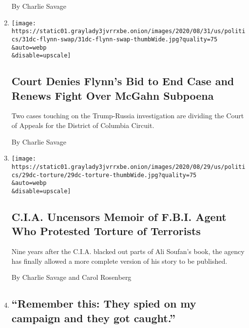\begin{enumerate}
  By Charlie Savage
\item
  \href{/2020/08/31/us/politics/michael-flynn-appeals-court.html}{}

  \texttt{[image: https://static01.graylady3jvrrxbe.onion/images/2020/08/31/us/politics/31dc-flynn-swap/31dc-flynn-swap-thumbWide.jpg?quality=75\\\&auto=webp\\\&disable=upscale]}

  \hypertarget{court-denies-flynns-bid-to-end-case-and-renews-fight-over-mcgahn-subpoena}{%
  \subsection{Court Denies Flynn's Bid to End Case and Renews Fight Over
  McGahn
  Subpoena}\label{court-denies-flynns-bid-to-end-case-and-renews-fight-over-mcgahn-subpoena}}

  Two cases touching on the Trump-Russia investigation are dividing the
  Court of Appeals for the District of Columbia Circuit.

  By Charlie Savage
\item
  \href{/2020/08/29/us/politics/ali-soufan-memoir-cia-torture.html}{}

  \texttt{[image: https://static01.graylady3jvrrxbe.onion/images/2020/08/29/us/politics/29dc-torture/29dc-torture-thumbWide.jpg?quality=75\\\&auto=webp\\\&disable=upscale]}

  \hypertarget{cia-uncensors-memoir-of-fbi-agent-who-protested-torture-of-terrorists}{%
  \subsection{C.I.A. Uncensors Memoir of F.B.I. Agent Who Protested
  Torture of
  Terrorists}\label{cia-uncensors-memoir-of-fbi-agent-who-protested-torture-of-terrorists}}

  Nine years after the C.I.A. blacked out parts of Ali Soufan's book,
  the agency has finally allowed a more complete version of his story to
  be published.

  By Charlie Savage and Carol Rosenberg
\item
  \href{/live/2020/08/27/us/rnc-fact-check/remember-this-they-spied-on-my-campaign-and-they-got-caught}{}

  \hypertarget{remember-this-they-spied-on-my-campaign-and-they-got-caught}{%
  \subsection{``Remember this: They spied on my campaign and they got
  caught.''}\label{remember-this-they-spied-on-my-campaign-and-they-got-caught}}


\end{enumerate}
